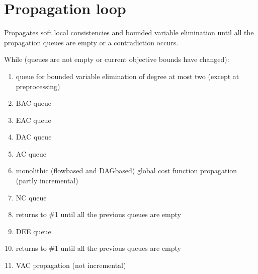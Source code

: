 \documentclass[letterpaper,10pt,openany,oneside,english]{sphinxmanual}
\begin{document}
\section{Propagation loop}
\label{\detokenize{ref/ref_modules:propagation-loop}}

\begin{fulllineitems}

\pysigstartsignatures
{}
\pysigstopsignatures
\sphinxAtStartPar

\sphinxAtStartPar
Propagates soft local consistencies and bounded variable elimination until all the propagation queues are empty or a contradiction occurs.

\sphinxAtStartPar
While (queues are not empty or current objective bounds have changed):
\begin{enumerate}
%
\item {} 
\sphinxAtStartPar
queue for bounded variable elimination of degree at most two (except at preprocessing)

\item {} 
\sphinxAtStartPar
BAC queue

\item {} 
\sphinxAtStartPar
EAC queue

\item {} 
\sphinxAtStartPar
DAC queue

\item {} 
\sphinxAtStartPar
AC queue

\item {} 
\sphinxAtStartPar
monolithic (flow\sphinxhyphen{}based and DAG\sphinxhyphen{}based) global cost function propagation (partly incremental)

\item {} 
\sphinxAtStartPar
NC queue

\item {} 
\sphinxAtStartPar
returns to \#1 until all the previous queues are empty

\item {} 
\sphinxAtStartPar
DEE queue

\item {} 
\sphinxAtStartPar
returns to \#1 until all the previous queues are empty

\item {} 
\sphinxAtStartPar
VAC propagation (not incremental)


\end{enumerate}
\end{fulllineitems}
\end{document}
